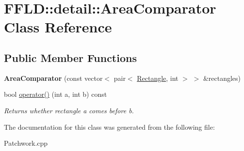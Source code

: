 \hypertarget{class_f_f_l_d_1_1detail_1_1_area_comparator}{\section{F\-F\-L\-D\-:\-:detail\-:\-:Area\-Comparator Class Reference}
\label{class_f_f_l_d_1_1detail_1_1_area_comparator}
}
\subsection*{Public Member Functions}
\begin{DoxyCompactItemize}
\item 
\hypertarget{class_f_f_l_d_1_1detail_1_1_area_comparator_a444ed565c52c89688649e77cd7185cda}{{\bfseries Area\-Comparator} (const vector$<$ pair$<$ \hyperlink{class_f_f_l_d_1_1_rectangle}{Rectangle}, int $>$ $>$ \&rectangles)}\label{class_f_f_l_d_1_1detail_1_1_area_comparator_a444ed565c52c89688649e77cd7185cda}

\item 
\hypertarget{class_f_f_l_d_1_1detail_1_1_area_comparator_af2d6531cc0f8d63b9dd171a3ffb9658f}{bool \hyperlink{class_f_f_l_d_1_1detail_1_1_area_comparator_af2d6531cc0f8d63b9dd171a3ffb9658f}{operator()} (int a, int b) const }\label{class_f_f_l_d_1_1detail_1_1_area_comparator_af2d6531cc0f8d63b9dd171a3ffb9658f}

\begin{DoxyCompactList}\small\item\em Returns whether rectangle {\ttfamily a} comes before {\ttfamily b}. \end{DoxyCompactList}\end{DoxyCompactItemize}


The documentation for this class was generated from the following file\-:\begin{DoxyCompactItemize}
\item 
Patchwork.\-cpp\end{DoxyCompactItemize}
